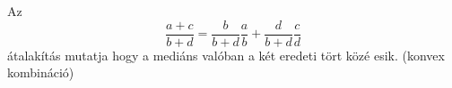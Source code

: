 Az
$$
\frac{a+c}{b+d} = \frac{b}{b+d}\frac{a}{b}+\frac{d}{b+d}\frac{c}{d}
$$
átalakítás mutatja hogy a mediáns valóban a két eredeti tört közé esik.
(konvex kombináció)
